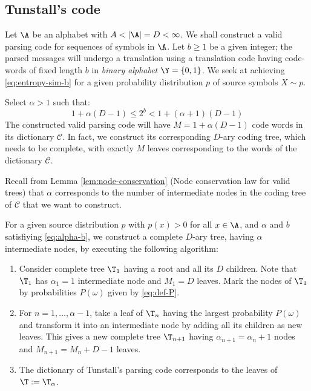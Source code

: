 \documentclass[toc]{../cs-classes/cs-classes}
\begin{document}
\subsection{Tunstall's code}
Let $\A$ be an alphabet with $A<|\A|=D<\infty$. We shall construct a valid parsing code for sequences of symbols in $\A$. Let $b\geq1$ be a given integer; the parsed messages will undergo a translation using a translation code having code-words of fixed length $b$ in \emph{binary alphabet} $\Y=\{0, 1\}$. We seek at achieving \eqref{eq:entropy-sim-b} for a given probability distribution $p$ of source symbols $X\sim p$.

Select $\alpha>1$ such that:
\begin{equation}
    \label{eq:alpha-b}
    1 + \alpha(D-1)\leq2^b<1+(\alpha+1)(D-1)
\end{equation}
The constructed valid parsing code will have $M=1+\alpha(D-1)$ code words in its dictionary $\mathcal{C}$. In fact, we construct its corresponding $D$-ary coding tree, which needs to be complete, with exactly $M$ leaves corresponding to the words of the dictionary $\mathcal{C}$.

Recall from Lemma \ref{lem:node-conservation} (Node conservation law for valid trees) that $\alpha$ corresponds to the number of intermediate nodes in the coding tree of $\mathcal{C}$ that we want to construct.

\begin{definition}
    For a given source distribution $p$ with $p(x)>0$ for all $x\in\A$, and $\alpha$ and $b$ satisfiying \eqref{eq:alpha-b}, we construct a complete $D$-ary tree, having $\alpha$ intermediate nodes, by executing the following algorithm:
    \begin{enumerate}
        \item Consider complete tree $\T_1$ having a root and all its $D$ children. Note that $\T_1$ has $\alpha_1=1$ intermediate node and $M_1=D$ leaves. Mark the nodes of $\T_1$ by probabilities $P(\omega)$ given by \eqref{eq:def-P}.
        \item For $n=1, \dots, \alpha-1$, take a leaf of $\T_n$ having the largest probability $P(\omega)$ and transform it into an intermediate node by adding all its children as new leaves. This gives a new complete tree $\T_{n+1}$ having $\alpha_{n+1}=\alpha_n + 1$ nodes and $M_{n+1}=M_n+D-1$ leaves. 
        \item The dictionary of Tunstall's parsing code corresponds to the leaves of $\T:=\T_\alpha$.
    \end{enumerate}
\end{definition}
\end{document}
